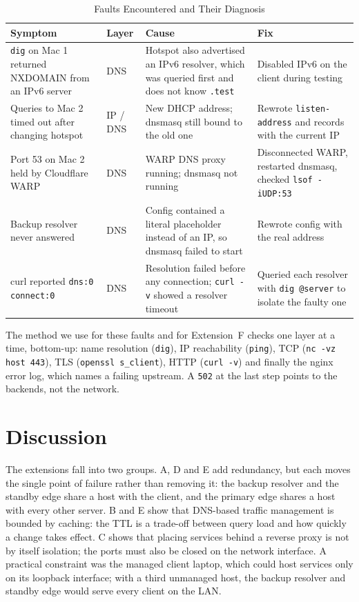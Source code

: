 \documentclass[conference]{IEEEtran}
\newcommand{\cmd}[1]{\texttt{#1}}
\begin{document}
\begin{table}[htbp]
\caption{Faults Encountered and Their Diagnosis}
\label{tab:faults}
\centering
\begin{tabular}{@{}>{\raggedright}p{4.2cm} l >{\raggedright}p{5.6cm} >{\raggedright\arraybackslash}p{4.6cm}@{}}
\toprule
Symptom & Layer & Cause & Fix \\
\midrule
\cmd{dig} on Mac 1 returned NXDOMAIN from an IPv6 server & DNS & Hotspot also advertised an IPv6 resolver, which was queried first and does not know \cmd{.test} & Disabled IPv6 on the client during testing \\
Queries to Mac 2 timed out after changing hotspot & IP / DNS & New DHCP address; dnsmasq still bound to the old one & Rewrote \cmd{listen-address} and records with the current IP \\
Port 53 on Mac 2 held by Cloudflare WARP & DNS & WARP DNS proxy running; dnsmasq not running & Disconnected WARP, restarted dnsmasq, checked \cmd{lsof -iUDP:53} \\
Backup resolver never answered & DNS & Config contained a literal placeholder instead of an IP, so dnsmasq failed to start & Rewrote config with the real address \\
curl reported \cmd{dns:0 connect:0} & DNS & Resolution failed before any connection; \cmd{curl -v} showed a resolver timeout & Queried each resolver with \cmd{dig @server} to isolate the faulty one \\
\bottomrule
\end{tabular}
\end{table}

The method we use for these faults and for Extension~F checks one layer at a time, bottom-up: name resolution (\cmd{dig}), IP reachability (\cmd{ping}), TCP (\cmd{nc -vz host 443}), TLS (\cmd{openssl s\_client}), HTTP (\cmd{curl -v}) and finally the nginx error log, which names a failing upstream. A \cmd{502} at the last step points to the backends, not the network.

\section{Discussion}
The extensions fall into two groups. A, D and E add redundancy, but each moves the single point of failure rather than removing it: the backup resolver and the standby edge share a host with the client, and the primary edge shares a host with every other server. B and E show that DNS-based traffic management is bounded by caching: the TTL is a trade-off between query load and how quickly a change takes effect. C shows that placing services behind a reverse proxy is not by itself isolation; the ports must also be closed on the network interface. A practical constraint was the managed client laptop, which could host services only on its loopback interface; with a third unmanaged host, the backup resolver and standby edge would serve every client on the LAN.
\end{document}
